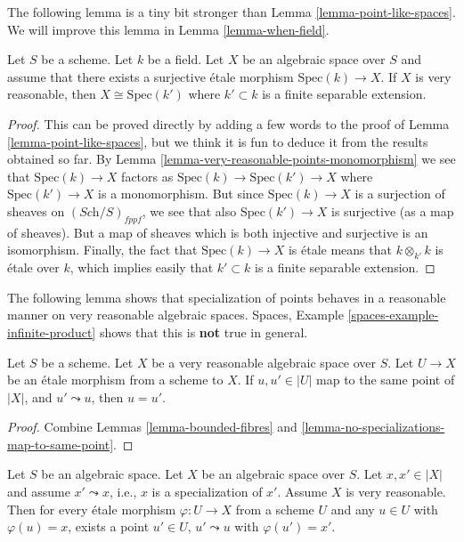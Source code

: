 \noindent
The following lemma is a tiny bit stronger than
Lemma \ref{lemma-point-like-spaces}.
We will improve this lemma in Lemma \ref{lemma-when-field}.

\begin{lemma}
\label{lemma-very-reasonable-point-like-spaces}
Let $S$ be a scheme. Let $k$ be a field.
Let $X$ be an algebraic space over $S$ and assume that there exists
a surjective \'etale morphism $\text{Spec}(k) \to X$.
If $X$ is very reasonable, then $X \cong \text{Spec}(k')$
where $k' \subset k$ is a finite separable extension.
\end{lemma}

\begin{proof}
This can be proved directly by adding a few words to the proof of
Lemma \ref{lemma-point-like-spaces},
but we think it is fun to deduce it from the results obtained so far.
By Lemma \ref{lemma-very-reasonable-points-monomorphism}
we see that $\text{Spec}(k) \to X$ factors as
$\text{Spec}(k) \to \text{Spec}(k') \to X$ where
$\text{Spec}(k') \to X$ is a monomorphism. But since $\text{Spec}(k) \to X$
is a surjection of sheaves on $(\textit{Sch}/S)_{fppf}$, we see that
also $\text{Spec}(k') \to X$ is surjective (as a map of sheaves). But a
map of sheaves which is both injective and surjective is an isomorphism.
Finally, the fact that $\text{Spec}(k) \to X$ is \'etale means that
$k \otimes_{k'} k$ is \'etale over $k$, which implies easily that
$k' \subset k$ is a finite separable extension.
\end{proof}

\noindent
The following lemma shows that specialization of points behaves in a
reasonable manner on very reasonable algebraic spaces.
Spaces, Example \ref{spaces-example-infinite-product}
shows that this is {\bf not} true in general.

\begin{lemma}
\label{lemma-very-reasonable-no-specializations-map-to-same-point}
Let $S$ be a scheme.
Let $X$ be a very reasonable algebraic space over $S$.
Let $U \to X$ be an \'etale morphism from a scheme to $X$.
If $u, u' \in |U|$ map to the same point of $|X|$, and
$u' \leadsto u$, then $u = u'$.
\end{lemma}

\begin{proof}
Combine Lemmas \ref{lemma-bounded-fibres} and
\ref{lemma-no-specializations-map-to-same-point}.
\end{proof}

\begin{lemma}
\label{lemma-very-reasonable-specialization}
Let $S$ be an algebraic space.
Let $X$ be an algebraic space over $S$.
Let $x, x' \in |X|$ and assume $x' \leadsto x$, i.e., $x$ is a
specialization of $x'$.
Assume $X$ is very reasonable. Then for every \'etale morphism
$\varphi : U \to X$ from a scheme $U$ and any $u \in U$ with
$\varphi(u) = x$, exists a point $u'\in U$, $u' \leadsto u$ with
$\varphi(u') = x'$.
\end{lemma}

